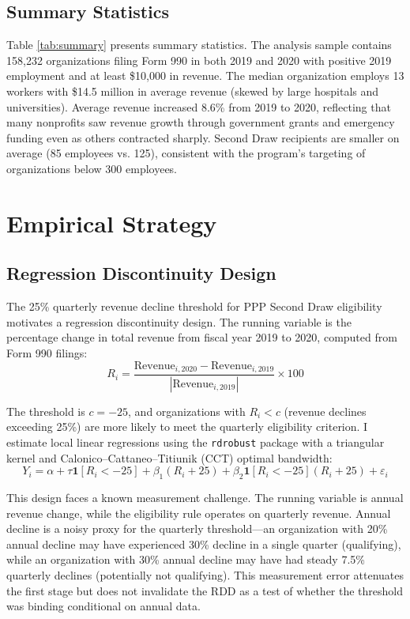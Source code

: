 \documentclass[12pt]{article}
\begin{document}
\subsection{Summary Statistics}



Table \ref{tab:summary} presents summary statistics. The analysis sample contains 158,232 organizations filing Form 990 in both 2019 and 2020 with positive 2019 employment and at least \$10,000 in revenue. The median organization employs 13 workers with \$14.5 million in average revenue (skewed by large hospitals and universities). Average revenue increased 8.6\% from 2019 to 2020, reflecting that many nonprofits saw revenue growth through government grants and emergency funding even as others contracted sharply. Second Draw recipients are smaller on average (85 employees vs. 125), consistent with the program's targeting of organizations below 300 employees.


\section{Empirical Strategy}

\subsection{Regression Discontinuity Design}

The 25\% quarterly revenue decline threshold for PPP Second Draw eligibility motivates a regression discontinuity design. The running variable is the percentage change in total revenue from fiscal year 2019 to 2020, computed from Form 990 filings:
\begin{equation}
R_i = \frac{\text{Revenue}_{i,2020} - \text{Revenue}_{i,2019}}{|\text{Revenue}_{i,2019}|} \times 100
\end{equation}

The threshold is $c = -25$, and organizations with $R_i < c$ (revenue declines exceeding 25\%) are more likely to meet the quarterly eligibility criterion. I estimate local linear regressions using the \texttt{rdrobust} package \citep{cattaneo2020} with a triangular kernel and Calonico--Cattaneo--Titiunik (CCT) optimal bandwidth:
\begin{equation}
Y_i = \alpha + \tau \mathbf{1}[R_i < -25] + \beta_1 (R_i + 25) + \beta_2 \mathbf{1}[R_i < -25](R_i + 25) + \varepsilon_i
\end{equation}

This design faces a known measurement challenge. The running variable is annual revenue change, while the eligibility rule operates on quarterly revenue. Annual decline is a noisy proxy for the quarterly threshold---an organization with 20\% annual decline may have experienced 30\% decline in a single quarter (qualifying), while an organization with 30\% annual decline may have had steady 7.5\% quarterly declines (potentially not qualifying). This measurement error attenuates the first stage but does not invalidate the RDD as a test of whether the threshold was binding conditional on annual data.
\end{document}
